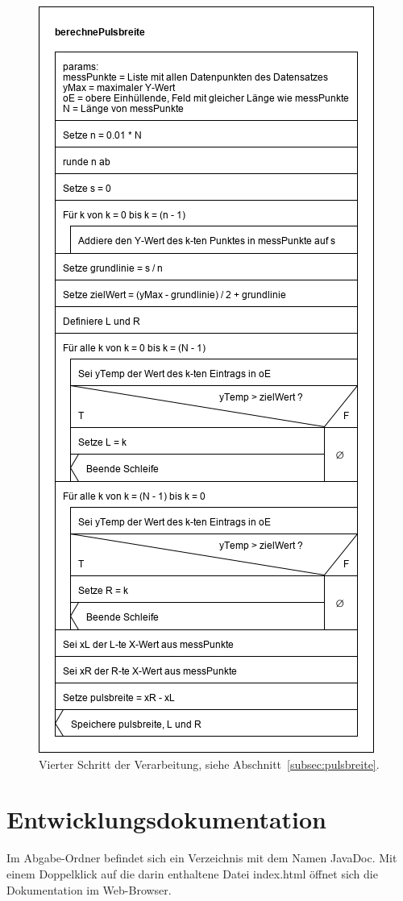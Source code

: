 \begin{figure}[htb]
    \centering
    \includegraphics[width=0.7\linewidth]{images/berechnePulsbreite}
    \caption{
        Vierter Schritt der Verarbeitung, siehe Abschnitt~\ref{subsec:pulsbreite}.
    }
    \label{fig:puls-strukto}
\end{figure}

\section{Entwicklungsdokumentation}\label{sec:entwicklerdokumentation}
Im Abgabe-Ordner befindet sich ein Verzeichnis mit dem Namen \glqq JavaDoc\grqq{}.
Mit einem Doppelklick auf die darin enthaltene Datei \glqq index.html\grqq{} öffnet sich die Dokumentation im Web-Browser.